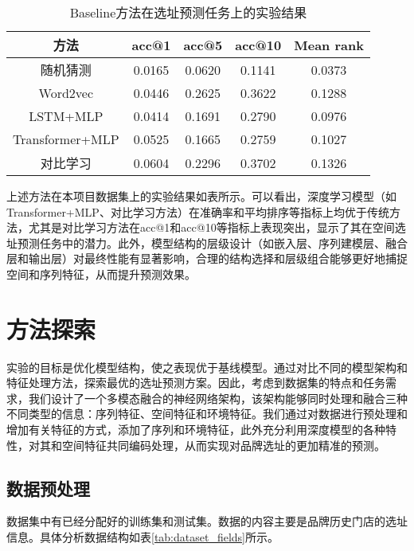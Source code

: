 \documentclass{article}
\begin{document}
\begin{table}[H]
\centering
\begin{tabular}{|c|c|c|c|c|}
\hline
\rowcolor[HTML]{D9EAD3}
\textbf{方法} & \textbf{acc@1} & \textbf{acc@5} & \textbf{acc@10} & \textbf{Mean rank} \\ \hline
随机猜测 & 0.0165 & 0.0620 & 0.1141 & 0.0373 \\ \hline
Word2vec & 0.0446 & 0.2625 & 0.3622 & 0.1288 \\ \hline
LSTM+MLP & 0.0414 & 0.1691 & 0.2790 & 0.0976 \\ \hline
Transformer+MLP & 0.0525 & 0.1665 & 0.2759 & 0.1027 \\ \hline
对比学习 & 0.0604 & 0.2296 & 0.3702 & 0.1326 \\ \hline
\end{tabular}
\caption{Baseline方法在选址预测任务上的实验结果}
\label{tab:baseline_results}
\end{table}


上述方法在本项目数据集上的实验结果如表所示。可以看出，深度学习模型（如Transformer+MLP、对比学习方法）在准确率和平均排序等指标上均优于传统方法，尤其是对比学习方法在acc@1和acc@10等指标上表现突出，显示了其在空间选址预测任务中的潜力。此外，模型结构的层级设计（如嵌入层、序列建模层、融合层和输出层）对最终性能有显著影响，合理的结构选择和层级组合能够更好地捕捉空间和序列特征，从而提升预测效果。

\section{方法探索}

实验的目标是优化模型结构，使之表现优于基线模型。通过对比不同的模型架构和特征处理方法，探索最优的选址预测方案。因此，考虑到数据集的特点和任务需求，我们设计了一个多模态融合的神经网络架构，该架构能够同时处理和融合三种不同类型的信息：序列特征、空间特征和环境特征。我们通过对数据进行预处理和增加有关特征的方式，添加了序列和环境特征，此外充分利用深度模型的各种特性，对其和空间特征共同编码处理，从而实现对品牌选址的更加精准的预测。

\subsection{数据预处理}

数据集中有已经分配好的训练集和测试集。数据的内容主要是品牌历史门店的选址信息。具体分析数据结构如表\ref{tab:dataset_fields}所示。
\end{document}
